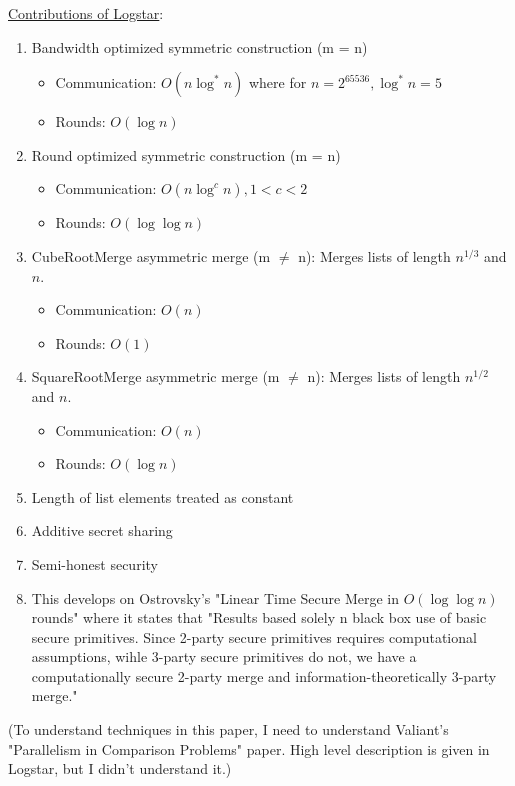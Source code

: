 \underline{Contributions of Logstar}:
\begin{enumerate}
   \item Bandwidth optimized symmetric construction (m = n)
    \begin{itemize}
        \item Communication: $O(n \log ^* n)$ where for $n = 2^{65536}, \log ^* n = 5$
        \item Rounds: $O(\log n)$
    \end{itemize}
    \item Round optimized symmetric construction (m = n)
    \begin{itemize}
        \item Communication: $O(n \log ^c n), 1 < c < 2$ 
        \item Rounds: $O(\log \log n)$ 
    \end{itemize}
    \item CubeRootMerge asymmetric merge (m $\ne$ n): Merges lists of length $n^{1/3}$ and $n$.
    \begin{itemize}
        \item Communication: $O(n)$ 
        \item Rounds: $O(1)$ 
    \end{itemize}
    \item SquareRootMerge asymmetric merge (m $\ne$ n): Merges lists of length $n^{1/2}$ and $n$.

    \begin{itemize}
        \item Communication: $O(n)$
        \item Rounds: $O(\log n)$
    \end{itemize}
    \item Length of list elements treated as constant
    \item Additive secret sharing
    \item Semi-honest security
    \item This develops on Ostrovsky's "Linear Time Secure Merge in $O(\log \log n)$ rounds" where it states that "Results based solely n black box use of basic secure primitives. Since 2-party secure primitives requires computational assumptions, wihle 3-party secure primitives do not, we have a computationally secure 2-party merge and information-theoretically 3-party merge."
\end{enumerate}

(To understand techniques in this paper, I need to understand Valiant's "Parallelism in Comparison Problems" paper. High level description is given in Logstar, but I didn't understand it.)



%
